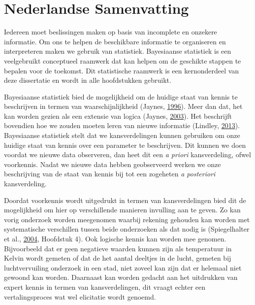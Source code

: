 \documentclass[openright,titlepage,12pt,a4paper]{book}
\begin{document}
\pagestyle{headings}

\makeatletter
\renewcommand\chaptermark[1]{%
    \markboth{\MakeUppercase{#1}}{}
}
\makeatother

\hypertarget{nederlandse-samenvatting}{%
\chapter*{Nederlandse Samenvatting}\label{nederlandse-samenvatting}}

%

\thispagestyle{empty}


Iedereen moet beslissingen maken op basis van incomplete en onzekere informatie. Om ons te helpen de beschikbare informatie te organiseren en interpreteren maken we gebruik van statistiek. Bayesiaanse statistiek is een veelgebruikt conceptueel raamwerk dat kan helpen om de geschikte stappen te bepalen voor de toekomst. Dit statistische raamwerk is een kernonderdeel van deze dissertatie en wordt in alle hoofdstukken gebruikt.

Bayesiaanse statistiek bied de mogelijkheid om de huidige staat van kennis te beschrijven in termen van waarschijnlijkheid (Jaynes, \protect\hyperlink{ref-jaynes_bayesian_1996}{1996}). Meer dan dat, het kan worden gezien als een extensie van logica (Jaynes, \protect\hyperlink{ref-jaynes_probability_2003}{2003}). Het beschrijft bovendien hoe we zouden moeten leren van nieuwe informatie (Lindley, \protect\hyperlink{ref-lindley_understanding_2013}{2013}). Bayesiaanse statistiek stelt dat we kansverdelingen kunnen gebruiken om onze huidige staat van kennis over een parameter te beschrijven. Dit kunnen we doen voordat we nieuwe data observeren, dan heet dit een \emph{a priori} kansverdeling, ofwel voorkennis. Nadat we nieuwe data hebben geobserveerd werken we onze beschrijving van de staat van kennis bij tot een zogeheten \emph{a posteriori} kansverdeling.

Doordat voorkennis wordt uitgedrukt in termen van kansverdelingen bied dit de mogelijkheid om hier op verschillende manieren invulling aan te geven. Zo kan vorig onderzoek worden meegenomen waarbij rekening gehouden kan worden met systematische verschillen tussen beide onderzoeken als dat nodig is (Spiegelhalter et al., \protect\hyperlink{ref-spiegelhalter_bayesian_2004}{2004}, Hoofdstuk 4). Ook logische kennis kan worden mee genomen. Bijvoorbeeld dat er geen negatieve waarden kunnen zijn als temperatuur in Kelvin wordt gemeten of dat de het aantal deeltjes in de lucht, gemeten bij luchtvervuiling onderzoek in een stad, niet zoveel kan zijn dat er helemaal niet gewoond kan worden. Daarnaast kan worden gedacht aan het uitdrukken van expert kennis in termen van kansverdelingen, dit vraagt echter een vertalingsproces wat wel elicitatie wordt genoemd.
\end{document}
